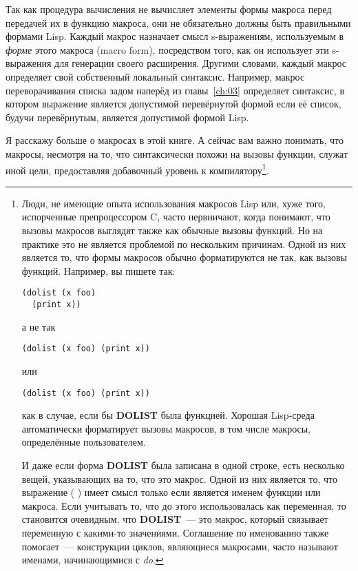 Так как процедура вычисления не вычисляет элементы формы макроса перед передачей их в
функцию макроса, они не обязательно должны быть правильными формами Lisp. Каждый макрос
назначает смысл s-выражениям, используемым в \textit{форме} этого макроса (macro form),
посредством того, как он использует эти s-выражения для генерации своего
расширения. Другими словами, каждый макрос определяет свой собственный локальный
синтаксис. Например, макрос переворачивания списка задом наперёд из главы~\ref{ch:03} определяет
синтаксис, в котором выражение является допустимой перевёрнутой формой если её список,
будучи перевёрнутым, является допустимой формой Lisp.

Я расскажу больше о макросах в этой книге. А сейчас вам важно понимать, что макросы,
несмотря на то, что синтаксически похожи на вызовы функции, служат иной цели, предоставляя
добавочный уровень к компилятору\footnote{Люди, не имеющие опыта использования макросов
  Lisp или, хуже того, испорченные препроцессором C, часто нервничают, когда понимают, что
  вызовы макросов выглядят также как обычные вызовы функций. Но на практике это не
  является проблемой по нескольким причинам. Одной из них является то, что формы макросов
  обычно форматируются не так, как вызовы функций. Например, вы пишете так:

\begin{lstlisting}
(dolist (x foo)
  (print x))
\end{lstlisting}

\noindent{}а не так

\begin{lstlisting}
(dolist (x foo) (print x))
\end{lstlisting}

\noindent{}или 

\begin{lstlisting}
(dolist (x foo) (print x))
\end{lstlisting}

\noindent{}как в случае, если бы \textbf{DOLIST} была функцией. Хорошая Lisp-среда автоматически
форматирует вызовы макросов, в том числе макросы, определённые пользователем.

И даже если форма \textbf{DOLIST} была записана в одной строке, есть несколько вещей,
указывающих на то, что это макрос. Одной из них является то, что выражение (
) имеет смысл только если  является именем функции или макроса. Если
учитывать то, что до этого  использовалась как переменная, то становится
очевидным, что \textbf{DOLIST}~--- это макрос, который связывает переменную  с
какими-то значениями. Соглашение по именованию также помогает~--- конструкции циклов,
являющиеся макросами, часто называют именами, начинающимися с \textit{do}.}.

